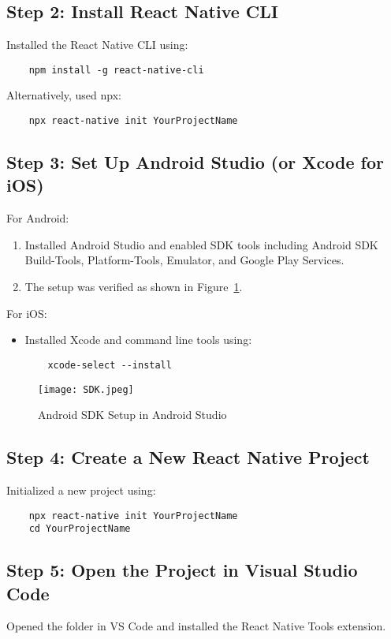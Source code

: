 \documentclass{article}
\begin{document}
\subsection{Step 2: Install React Native CLI}
Installed the React Native CLI using:
\begin{verbatim}
    npm install -g react-native-cli
\end{verbatim}
Alternatively, used npx:
\begin{verbatim}
    npx react-native init YourProjectName
\end{verbatim}

\subsection{Step 3: Set Up Android Studio (or Xcode for iOS)}
For Android:
\begin{enumerate}
    \item Installed Android Studio and enabled SDK tools including Android SDK Build-Tools, Platform-Tools, Emulator, and Google Play Services.
    \item The setup was verified as shown in Figure~\ref{fig:sdk_setup}.
\end{enumerate}
For iOS:
\begin{itemize}
    \item Installed Xcode and command line tools using:
    \begin{verbatim}
    xcode-select --install
    \end{verbatim}
\end{itemize}

\begin{figure}[H]
    \centering
    \texttt{[image: SDK.jpeg]}
    \caption{Android SDK Setup in Android Studio}
    \label{fig:sdk_setup}
\end{figure}

\subsection{Step 4: Create a New React Native Project}
Initialized a new project using:
\begin{verbatim}
    npx react-native init YourProjectName
    cd YourProjectName
\end{verbatim}

\subsection{Step 5: Open the Project in Visual Studio Code}
Opened the folder in VS Code and installed the React Native Tools extension.
\end{document}
